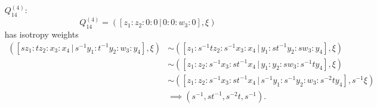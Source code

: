 \documentclass{article}
\begin{document}
\begin{itemize}
		\item[$Q_{14}^{(4)}$:]
		\[
		Q_{14}^{(4)} = \left( [ z_{1} : z_{2} : 0 : 0 \, | \, 0 : 0 : w_{3} : 0 ], \xi \right)
		\]
		has isotropy weights
		\begin{align*}
			\left( [sz_{1} : tz_{2} : x_{3} : x_{4} \, | \, s^{-1}y_{1} : t^{-1}y_{2} : w_{3} : y_{4}], \xi \right) &\sim \left( [z_{1} : s^{-1}tz_{2} : s^{-1}x_{3} : x_{4} \, | \, y_{1} : st^{-1}y_{2} : sw_{3} : y_{4}], \xi \right) \\ &\sim \left( [z_{1} : z_{2} : s^{-1}x_{3} : st^{-1}x_{4} \, | \, y_{1} : y_{2} : sw_{3} : s^{-1}ty_{4}], \xi \right) \\ &\sim \left( [z_{1} : z_{2} : s^{-1}x_{3} : st^{-1}x_{4} \, | \, s^{-1}y_{1} : s^{-1}y_{2} : w_{3} : s^{-2}ty_{4}], s^{-1}\xi \right) \\ &\implies (s^{-1}, st^{-1}, s^{-2}t, s^{-1}).
		\end{align*}
	
	
	\end{itemize}
	

	
	
	
	
	
	
	
	
	
	
	
	
	
	
	
	
	
	
	
	
	
	
	  
	
	
\end{document}
